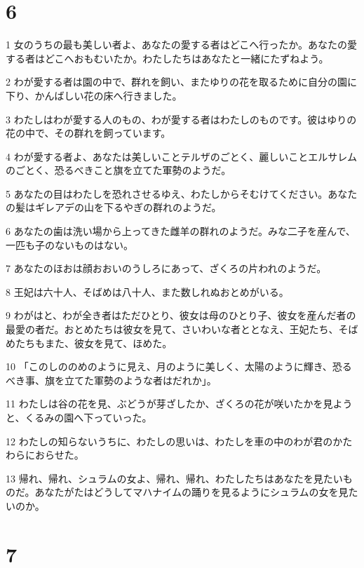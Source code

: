 \chapter{6}

\par 1 女のうちの最も美しい者よ、あなたの愛する者はどこへ行ったか。あなたの愛する者はどこへおもむいたか。わたしたちはあなたと一緒にたずねよう。
\par 2 わが愛する者は園の中で、群れを飼い、またゆりの花を取るために自分の園に下り、かんばしい花の床へ行きました。
\par 3 わたしはわが愛する人のもの、わが愛する者はわたしのものです。彼はゆりの花の中で、その群れを飼っています。
\par 4 わが愛する者よ、あなたは美しいことテルザのごとく、麗しいことエルサレムのごとく、恐るべきこと旗を立てた軍勢のようだ。
\par 5 あなたの目はわたしを恐れさせるゆえ、わたしからそむけてください。あなたの髪はギレアデの山を下るやぎの群れのようだ。
\par 6 あなたの歯は洗い場から上ってきた雌羊の群れのようだ。みな二子を産んで、一匹も子のないものはない。
\par 7 あなたのほおは顔おおいのうしろにあって、ざくろの片われのようだ。
\par 8 王妃は六十人、そばめは八十人、また数しれぬおとめがいる。
\par 9 わがはと、わが全き者はただひとり、彼女は母のひとり子、彼女を産んだ者の最愛の者だ。おとめたちは彼女を見て、さいわいな者ととなえ、王妃たち、そばめたちもまた、彼女を見て、ほめた。
\par 10 「このしののめのように見え、月のように美しく、太陽のように輝き、恐るべき事、旗を立てた軍勢のような者はだれか」。
\par 11 わたしは谷の花を見、ぶどうが芽ざしたか、ざくろの花が咲いたかを見ようと、くるみの園へ下っていった。
\par 12 わたしの知らないうちに、わたしの思いは、わたしを車の中のわが君のかたわらにおらせた。
\par 13 帰れ、帰れ、シュラムの女よ、帰れ、帰れ、わたしたちはあなたを見たいものだ。あなたがたはどうしてマハナイムの踊りを見るようにシュラムの女を見たいのか。

\chapter{7}

